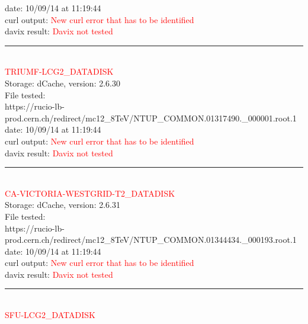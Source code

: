 date: 10/09/14 at 11:19:44\\

curl output:  \textcolor{red}{New curl error that has to be identified}\\

davix result:  \textcolor{red}{Davix not tested}\\

\rule{\textwidth}{1pt}\\

\textcolor{red}{\normalsize{TRIUMF-LCG2\_DATADISK}}\\

Storage: dCache, version: 2.6.30\\

File tested:\\
\footnotesize{https://rucio-lb-prod.cern.ch/redirect/mc12\_8TeV/NTUP\_COMMON.01317490.\_000001.root.1}\\

date: 10/09/14 at 11:19:44\\

curl output:  \textcolor{red}{New curl error that has to be identified}\\

davix result:  \textcolor{red}{Davix not tested}\\

\rule{\textwidth}{1pt}\\

\textcolor{red}{\normalsize{CA-VICTORIA-WESTGRID-T2\_DATADISK}}\\

Storage: dCache, version: 2.6.31\\

File tested:\\
\footnotesize{https://rucio-lb-prod.cern.ch/redirect/mc12\_8TeV/NTUP\_COMMON.01344434.\_000193.root.1}\\

date: 10/09/14 at 11:19:44\\

curl output:  \textcolor{red}{New curl error that has to be identified}\\

davix result:  \textcolor{red}{Davix not tested}\\

\rule{\textwidth}{1pt}\\

\textcolor{red}{\normalsize{SFU-LCG2\_DATADISK}}\\

